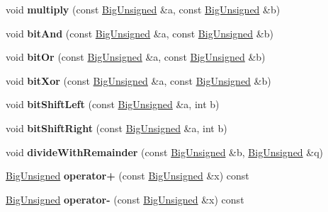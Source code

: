 \begin{DoxyCompactItemize}
void {\bfseries multiply} (const \mbox{\hyperlink{class_big_unsigned}{Big\+Unsigned}} \&a, const \mbox{\hyperlink{class_big_unsigned}{Big\+Unsigned}} \&b)
\item 
\mbox{\label{class_big_unsigned_ada2203c28685df642ac3ee31cac8f04c}} 
void {\bfseries bit\+And} (const \mbox{\hyperlink{class_big_unsigned}{Big\+Unsigned}} \&a, const \mbox{\hyperlink{class_big_unsigned}{Big\+Unsigned}} \&b)
\item 
\mbox{\label{class_big_unsigned_a5b64f2df508249a37f0a36c58d2f1569}} 
void {\bfseries bit\+Or} (const \mbox{\hyperlink{class_big_unsigned}{Big\+Unsigned}} \&a, const \mbox{\hyperlink{class_big_unsigned}{Big\+Unsigned}} \&b)
\item 
\mbox{\label{class_big_unsigned_a25e82a1bddb423d80a7685e3dd437baa}} 
void {\bfseries bit\+Xor} (const \mbox{\hyperlink{class_big_unsigned}{Big\+Unsigned}} \&a, const \mbox{\hyperlink{class_big_unsigned}{Big\+Unsigned}} \&b)
\item 
\mbox{\label{class_big_unsigned_aec82757ab11e1c6e87a668b47e0a2f47}} 
void {\bfseries bit\+Shift\+Left} (const \mbox{\hyperlink{class_big_unsigned}{Big\+Unsigned}} \&a, int b)
\item 
\mbox{\label{class_big_unsigned_a1af24293bb3d87df1fc9a9f731e6c7ef}} 
void {\bfseries bit\+Shift\+Right} (const \mbox{\hyperlink{class_big_unsigned}{Big\+Unsigned}} \&a, int b)
\item 
\mbox{\label{class_big_unsigned_a39e6a0e2d960dee0e89acf4d2398d5f1}} 
void {\bfseries divide\+With\+Remainder} (const \mbox{\hyperlink{class_big_unsigned}{Big\+Unsigned}} \&b, \mbox{\hyperlink{class_big_unsigned}{Big\+Unsigned}} \&q)
\item 
\mbox{\label{class_big_unsigned_a62ef1b5f9b85737bc5baa681175f39e0}} 
\mbox{\hyperlink{class_big_unsigned}{Big\+Unsigned}} {\bfseries operator+} (const \mbox{\hyperlink{class_big_unsigned}{Big\+Unsigned}} \&x) const
\item 
\mbox{\label{class_big_unsigned_ad36b8526b5d2e2f96acd7daac5d7041b}} 
\mbox{\hyperlink{class_big_unsigned}{Big\+Unsigned}} {\bfseries operator-\/} (const \mbox{\hyperlink{class_big_unsigned}{Big\+Unsigned}} \&x) const

\end{DoxyCompactItemize}
